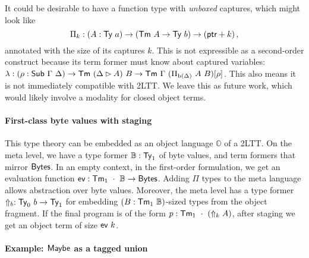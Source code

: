 It could be desirable to have a function type with \emph{unboxed} captures,
which might look like
\[
	\Pi_k : (A : \textsf{Ty}\ a) \to (\textsf{Tm}\ A \to \textsf{Ty}\ b) \to (\textsf{ptr} + k)  \,,
\]
annotated with the size of its captures $k$. This is not
expressible as a second-order construct because its term former must know about
captured variables:
$\lambda : (\rho : \syn{Sub}\ \Gamma\ \Delta) \to \Tm\ (\Delta \rhd A)\ B \to \Tm\ \Gamma\ (\Pi_{\textrm{b}(\Delta)}\ A\ B)[\rho]$.
This also means it is not immediately compatible with 2LTT. We leave this
as future work, which would likely involve a modality for closed object terms.


\paragraph{First-class byte values with staging}\label{layouts-staging}

This type theory can be embedded as an object language $\mathbb{O}$ of a 2LTT.
On the meta level, we have a type former $\mathbb{B} : \textsf{Ty}_1$ of byte
values, and term formers that mirror $\textsf{Bytes}$.
In an empty context, in the first-order formulation, we get an
evaluation function $\textsf{ev} : \textsf{Tm}_1\ \cdot\ \mathbb{B} \to \textsf{Bytes}$.
Adding $\Pi$ types to the meta language
allows abstraction over byte values. Moreover, the meta level has a type former
$\Uparrow_b : \textsf{Ty}_0\ b \to \textsf{Ty}_1$ for embedding $(B : \Tm_1\ \mathbb{B})$-sized types from
the object fragment. If the final program is of the form $p :
	\textsf{Tm}_1\ \cdot\ (\Uparrow_k A)$, after staging we get an object term of size $\textsf{ev}\ k$.



\paragraph{Example: $\textsf{Maybe}$ as a tagged union}\label{maybe-as-a-tagged-union}

